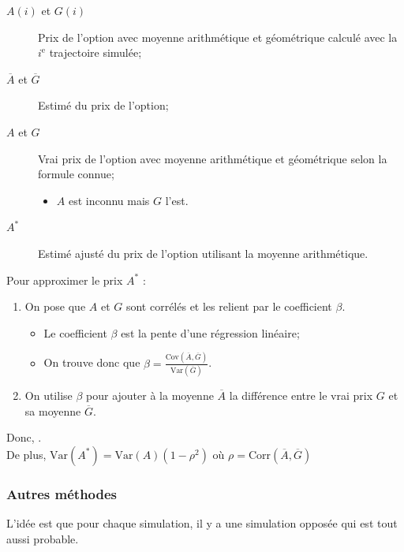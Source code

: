 \documentclass[10pt, french]{article}
\begin{document}
\begin{multicols*}{2}
\begin{distributions}[Notation]
\begin{description}
	\item[$A(i)$ et $G(i)$]	Prix de l'option avec moyenne arithmétique et géométrique calculé avec la $i^{\text{e}}$ trajectoire simulée;
	\item[$\overline{A}$ et $\overline{G}$]	Estimé du prix de l'option;
	\item[$A$ et $G$]	Vrai prix de l'option avec moyenne arithmétique et géométrique selon la formule connue;	
		\begin{itemize}
		\item	$A$ est inconnu mais $G$ l'est.
		\end{itemize}
	\item[$A^{*}$]	Estimé ajusté du prix de l'option utilisant la moyenne arithmétique.
\end{description}
\end{distributions}

Pour approximer le prix $A^{*}$ :
\begin{enumerate}
	\item	On pose que $A$ et $G$ sont corrélés et les relient par le coefficient $\beta$.
		\begin{itemize}
		\item	Le coefficient $\beta$ est la pente d'une régression linéaire;
		\item	On trouve donc que $\hat{\beta}	=	\frac{\text{Cov}(\overline{A}, \overline{G})}{\text{Var}(\overline{G})}$.
		\end{itemize}
	\item	On utilise $\beta$ pour ajouter à la moyenne $\overline{A}$ la différence entre le vrai prix $G$ et sa moyenne $\overline{G}$.
\end{enumerate}

Donc, .\\
De plus, $\text{Var}(A^{*})	=	\text{Var}(A)(1	-	\rho^{2})$ où $\rho	=	\text{Corr}(\overline{A}, \overline{G})$

\subsubsection*{Autres méthodes}
\begin{definitionNOHFILLsub}
L'idée est que pour chaque simulation, il y a une simulation opposée qui est tout aussi probable.\\


\end{definitionNOHFILLsub}
\end{multicols*}
\end{document}
